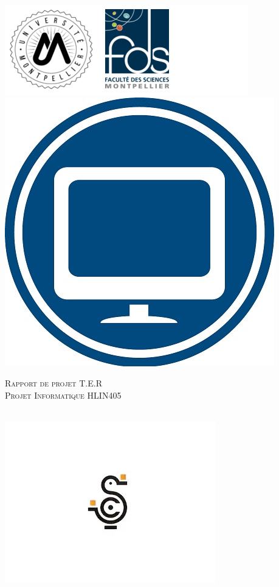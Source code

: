 \documentclass{report}
\begin{document}
\begin{titlepage}

\includegraphics[scale=0.5]{logoFDS.png}
\hfill
\includegraphics[scale=0.2]{logoInfo.jpg}
\vspace{1cm}

\begin{center}
\textsc{\Large{Rapport de projet T.E.R}} \\
\vspace{1cm}
\textsc{\Large{Projet Informatique HLIN405}} 
\vspace{1.5cm}

 \\
\vspace{2cm}
\includegraphics[scale=0.5]{logoPunyDuck.jpg}
\vfill
\end{center}


\end{titlepage}
\end{document}

